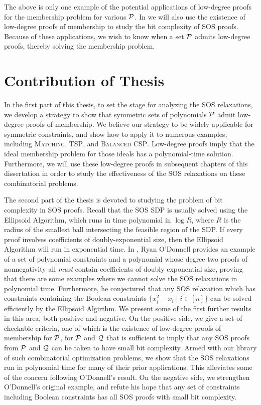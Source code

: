 The above is only one example of the potential applications of low-degree proofs for the membership problem for various $\mathcal P$. 
In  we will also use the existence of low-degree proofs of membership to study the bit complexity of SOS proofs. 
Because of these applications, we wish to know when a set $\mathcal P$ admits low-degree proofs, thereby solving the membership problem.

\section{Contribution of Thesis}\label{sec:intro_contrib}

In the first part of this thesis, to set the stage for analyzing the SOS relaxations, we develop a strategy to show that symmetric sets of polynomials $\mathcal P$ admit low-degree proofs of membership.
We believe our strategy to be widely applicable for symmetric constraints, and show how to apply it to numerous examples, including \textsc{Matching}, \textsc{TSP}, and \textsc{Balanced CSP}.
Low-degree proofs imply that the ideal membership problem for those ideals has a polynomial-time solution.
Furthermore, we will use these low-degree proofs in subsequent chapters of this dissertation in order to study the effectiveness of the SOS relaxations on these combinatorial problems.

The second part of the thesis is devoted to studying the problem of bit complexity in SOS proofs. 
Recall that the SOS SDP is usually solved using the Ellipsoid Algorithm, which runs in time polynomial in $\log R$, where $R$ is the radius of the smallest ball intersecting the feasible region of the SDP.
If every proof involves coefficients of doubly-exponential size, then the Ellipsoid Algorithm will run in exponential time.
In \cite{ODon16}, Ryan O'Donnell provides an example of a set of polynomial constraints and a polynomial whose degree two proofs of nonnegativity all \emph{must} contain coefficients of doubly exponential size, proving that there are some examples where we cannot solve the SOS relaxations in polynomial time.
Furthermore, he conjectured that any SOS relaxation which has constraints containing the Boolean constraints $\{x_i^2 - x_i \mid i \in [n]\}$ can be solved efficiently by the Ellipsoid Algirthm.
We present some of the first further results in this area, both positive and negative. 
On the positive side, we give a set of checkable criteria, one of which is the existence of low-degree proofs of membership for $\mathcal P$, for $\mathcal P$ and $\mathcal Q$ that is sufficient to imply that any SOS proofs from $\mathcal P$ and $\mathcal Q$ can be taken to have small bit complexity. Armed with our library of such combinatorial optimization problems, we show that the SOS relaxations run in polynomial time for many of their prior applications. This alleviates some of the concern following O'Donnell's result.
On the negative side, we strengthen O'Donnell's original example, and refute his hope that any set of constraints including Boolean constraints has all SOS proofs with small bit complexity.

